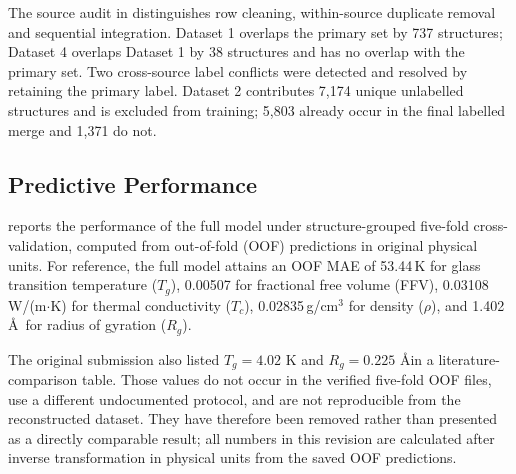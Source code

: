 \documentclass{article}
\begin{document}
The source audit in  distinguishes row cleaning, within-source duplicate removal and sequential integration. Dataset 1 overlaps the primary set by 737 structures; Dataset 4 overlaps Dataset 1 by 38 structures and has no overlap with the primary set. Two cross-source label conflicts were detected and resolved by retaining the primary label. Dataset 2 contributes 7{,}174 unique unlabelled structures and is excluded from training; 5{,}803 already occur in the final labelled merge and 1{,}371 do not.


\subsection{Predictive Performance}

 reports the performance of the full model under structure-grouped five-fold cross-validation, computed from out-of-fold (OOF) predictions in original physical units. For reference, the full model attains an OOF MAE of 53.44\,K for glass transition temperature ($T_g$), 0.00507 for fractional free volume (FFV), 0.03108\,W/(m$\cdot$K) for thermal conductivity ($T_c$), 0.02835\,g/cm$^3$ for density ($\rho$), and 1.402\,\AA\ for radius of gyration ($R_g$).

The original submission also listed $T_g=4.02$ K and $R_g=0.225$ \AA in a literature-comparison table. Those values do not occur in the verified five-fold OOF files, use a different undocumented protocol, and are not reproducible from the reconstructed dataset. They have therefore been removed rather than presented as a directly comparable result; all numbers in this revision are calculated after inverse transformation in physical units from the saved OOF predictions.
\end{document}
